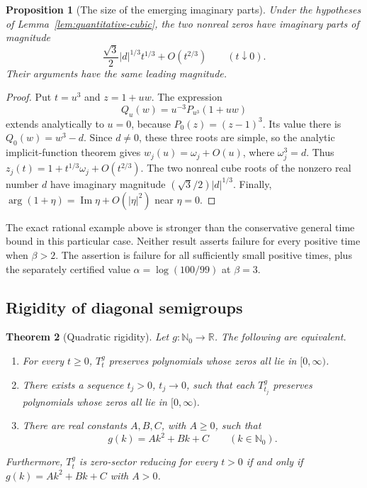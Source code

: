 \documentclass[11pt,a4paper]{article}
\newtheorem{theorem}{Theorem}[section]
\newtheorem{proposition}[theorem]{Proposition}
\theoremstyle{definition}
\theoremstyle{remark}
\begin{document}
\begin{proposition}[The size of the emerging imaginary parts]
\label{prop:splitting}
Under the hypotheses of Lemma~\ref{lem:quantitative-cubic}, the two
nonreal zeros have imaginary parts of magnitude
\[
 \frac{\sqrt3}{2}|d|^{1/3}t^{1/3}+O(t^{2/3})
 \qquad(t\downarrow0).
\]
Their arguments have the same leading magnitude.
\end{proposition}
\begin{proof}
Put $t=u^3$ and $z=1+uw$.  The expression
\[
 Q_u(w)=u^{-3}P_{u^3}(1+uw)
\]
extends analytically to $u=0$, because $P_0(z)=(z-1)^3$.
Its value there is $Q_0(w)=w^3-d$.  Since $d\ne0$, these three
roots are simple, so the analytic implicit-function theorem gives
$w_j(u)=\omega_j+O(u)$, where $\omega_j^3=d$.  Thus
$z_j(t)=1+t^{1/3}\omega_j+O(t^{2/3})$.  The two nonreal cube roots
of the nonzero real number $d$ have imaginary magnitude
$(\sqrt3/2)|d|^{1/3}$.  Finally,
$\arg(1+\eta)=\operatorname{Im}\eta+O(|\eta|^2)$ near $\eta=0$.
\end{proof}

The exact rational example above is stronger than the conservative
general time bound in this particular case.  Neither result asserts
failure for every positive time when $\beta>2$.  The assertion is
failure for all sufficiently small positive times, plus the separately
certified value $\alpha=\log(100/99)$ at $\beta=3$.

\subsection{Rigidity of diagonal semigroups}

\begin{theorem}[Quadratic rigidity]
\label{thm:diagonal-rigidity}
Let $g:\mathbb N_0\to\mathbb R$.  The following are equivalent.
\begin{enumerate}
\item For every $t\geq0$, $T_t^g$ preserves polynomials whose
zeros all lie in $[0,\infty)$.
\item There exists a sequence $t_j>0$, $t_j\to0$, such that
each $T_{t_j}^g$ preserves polynomials whose zeros all lie in
$[0,\infty)$.
\item There are real constants $A,B,C$, with $A\geq0$, such that
\[
 g(k)=Ak^2+Bk+C\qquad(k\in\mathbb N_0).
\]
\end{enumerate}
Furthermore, $T_t^g$ is zero-sector reducing for every $t>0$
if and only if $g(k)=Ak^2+Bk+C$ with $A>0$.
\end{theorem}
\end{document}
